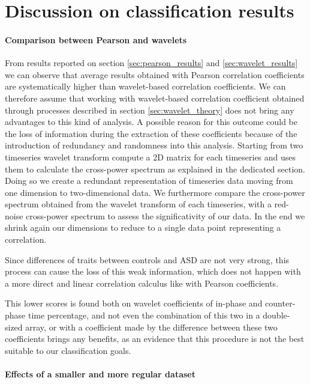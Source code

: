 \documentclass[11pt]{report}
\begin{document}
\section{Discussion on classification results}\label{sec:classification_discussion}

\paragraph{Comparison between Pearson and wavelets}
From results reported on section \ref{sec:pearson_results} and \ref{sec:wavelet_results} we can observe that average results obtained with Pearson correlation coefficients are systematically higher than wavelet-based correlation coefficients.
We can therefore assume that working with wavelet-based correlation coefficient obtained through processes described in section \ref{sec:wavelet_theory} does not bring any advantages to this kind of analysis.
A possible reason for this outcome could be the loss of information during the extraction of these coefficients because of the introduction of redundancy and randomness into this analysis. Starting from two timeseries wavelet transform compute a 2D matrix for each timeseries and uses them to calculate the cross-power spectrum as explained in the dedicated section.
Doing so we create a redundant representation of timeseries data moving from one dimension to two-dimensional data.
We furthermore compare the cross-power spectrum obtained from the wavelet transform of each timeseries, with a red-noise cross-power spectrum to assess the significativity of our data.
In the end we shrink again our dimensions to reduce to a single data point representing a correlation.

Since differences of traits between controls and ASD are not very strong, this process can cause the loss of this weak information, which does not happen with a more direct and linear correlation calculus like with Pearson coefficients.

This lower scores is found both on wavelet coefficients of in-phase and counter-phase time percentage, and not even the combination of this two in a double-sized array, or with a coefficient made by the difference between these two coefficients brings any benefits, as an evidence that this procedure is not the best suitable to our classification goals.

\paragraph{Effects of a smaller and more regular dataset}\hfill
\end{document}
